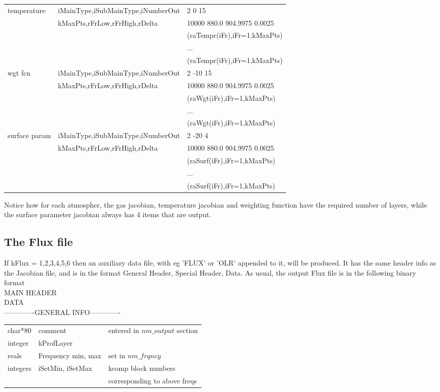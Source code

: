 \documentclass[12pt]{article}
\newlength{\colwidth}
\begin{document}
{{{{\begin{longtable}{llp{\colwidth}}
temperature   & iMainType,iSubMainType,iNumberOut  & 2 0 15\\
              & kMaxPts,rFrLow,rFrHigh,rDelta  & 10000 880.0 904.9975 0.0025 \\
              & & (raTempr(iFr),iFr=1,kMaxPts)\\
              & & ... \\ 
              & & (raTempr(iFr),iFr=1,kMaxPts)\\
wgt fcn       & iMainType,iSubMainType,iNumberOut  & 2 -10 15\\
              & kMaxPts,rFrLow,rFrHigh,rDelta  & 10000 880.0 904.9975 0.0025 \\
              & & (raWgt(iFr),iFr=1,kMaxPts)\\
              & & ... \\ 
              & & (raWgt(iFr),iFr=1,kMaxPts)\\
surface param & iMainType,iSubMainType,iNumberOut  & 2 -20 4\\
              & kMaxPts,rFrLow,rFrHigh,rDelta  & 10000 880.0 904.9975 0.0025 \\
              & & (raSurf(iFr),iFr=1,kMaxPts)\\
              & & ... \\ 
              & & (raSurf(iFr),iFr=1,kMaxPts)\\
\end{longtable}

Notice how for each atmospher, the gas jacobian, temperature jacobian and 
weighting function have the required number of layers, while the surface
parameter jacobian always has 4 items that are output.

\subsection{ The Flux file}

If kFlux = 1,2,3,4,5,6 then an auxiliary data file, with eg 'FLUX' or 'OLR' 
appended to it, will be produced.  It has the same header info as the 
Jacobian file, and is in the format General Header, Special Header, Data.  
As usual, the output Flux file is in the following binary format\\
MAIN HEADER\\
DATA\\

-------------GENERAL INFO-------------\\
\begin{longtable}{llp{\colwidth}}
{\sf char*80}    & comment & entered in $nm\_output$ section\\
{\sf integer}    & kProfLayer &\\
{\sf reals}      & Frequency min, max &set in $nm\_frqncy$\\
{\sf integers}   & iSetMin, iSetMax  & kcomp block numbers \\
                 &                   & corresponding to above freqs \\
\end{longtable}

}}}}
\end{document}
